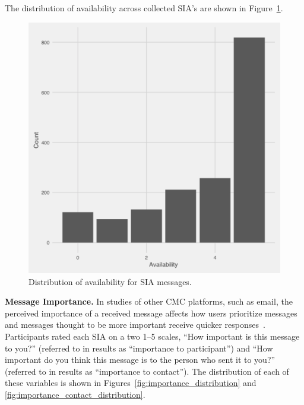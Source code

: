 \documentclass[12pt]{nuthesis}	%
\begin{document}
The distribution of availability across collected SIA's are shown in Figure~\ref{fig:availability_distribution}.

\begin{figure}[h]
\centering
\includegraphics[width=.7\textwidth]{figures/availability_distribution}
\caption{Distribution of availability for SIA messages.}
\label{fig:availability_distribution}
\end{figure}



\textbf{Message Importance.} In studies of other CMC platforms, such as email, the perceived importance of a received message affects how users prioritize messages~\citep{siu2006going,tsugawa2012estimating} and messages thought to be more important receive quicker responses~\citep{dabbish2005understanding,wainer2011should}. Participants rated each SIA on a two 1--5 scales, ``How important is this message to you?'' (referred to in results as ``importance to participant'') and ``How important do you think this message is to the person who sent it to you?'' (referred to in results as ``importance to contact''). The distribution of each of these variables is shown in Figures~\ref{fig:importance_distribution} and \ref{fig:importance_contact_distribution}.
\end{document}
